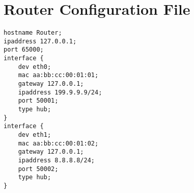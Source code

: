 \chapter{Router Configuration File}
\label{ch:config-file}
\lstset{language=inform,caption= ,label=lst:configfile}
\begin{lstlisting}
hostname Router;
ipaddress 127.0.0.1;
port 65000;
interface {
	dev eth0;
	mac aa:bb:cc:00:01:01;
	gateway 127.0.0.1;
	ipaddress 199.9.9.9/24;
	port 50001;
	type hub;
}
interface {
	dev eth1;
	mac aa:bb:cc:00:01:02;
	gateway 127.0.0.1;
	ipaddress 8.8.8.8/24;
	port 50002;
	type hub;
}
\end{lstlisting}
